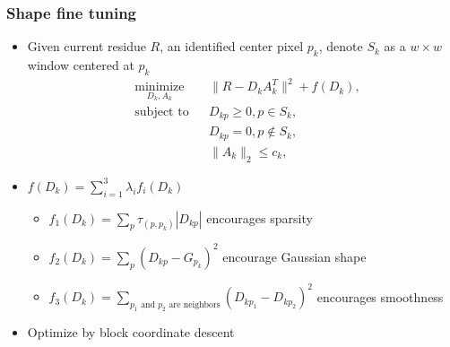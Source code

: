 \documentclass[16pt,presentation]{beamer}
\begin{document}
\begin{frame}
\frametitle{Shape fine tuning}
\begin{itemize}
\item Given current residue $R$, an identified center pixel $p_k$, denote $S_k$ as a $w \times w$ window centered at $p_k$
\[
\begin{aligned}
& \underset{D_k, A_k}{\text{minimize}}
& & \| R - D_k A_k^T \|^2 + f(D_k), \\%
& \text{subject to}
& & D_{kp} \geq 0, p \in S_k,\\
&
& & D_{kp} = 0, p \notin S_k,\\
& 
& & \|A_k\|_2 \leq c_k,
\end{aligned}
\]
\item $f(D_k) = \sum_{i=1}^3 \lambda_i f_i(D_k)$
\begin{itemize}
\item $f_1(D_k) = \sum_p \tau_{(p, p_k)} | D_{kp} |$ encourages sparsity
\item $f_2(D_k) = \sum_p (D_{kp} - G_{p_k})^2$ encourage Gaussian shape
\item $f_3(D_k) = \sum_{\text{$p_1$ and $p_2$ are neighbors}} (D_{kp_1} - D_{kp_2})^2$ encourages smoothness
\end{itemize}
\item Optimize by block coordinate descent
\end{itemize}
\end{frame}
\end{document}
